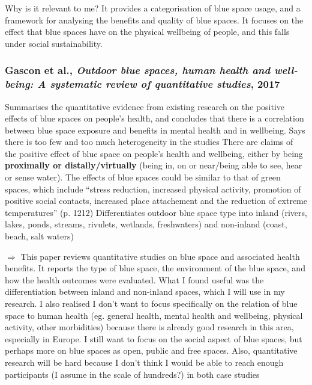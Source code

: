 \documentclass{article}
\begin{document}
\begin{outline}
	Why is it relevant to me? It provides a categorisation of blue space usage, and a framework for analysing the benefits and quality of blue spaces. It focuses on the effect that blue spaces have on the physical wellbeing of people, and this falls under social sustainability. 
\end{outline}

\subsubsection{Gascon et al., \textit{Outdoor blue spaces, human health and well-being: A systematic review of quantitative studies}, 2017} \parencite{gascon2017outdoor}

\begin{outline}
	\1 Summarises the quantitative evidence from existing research on the positive effects of blue spaces on people's health, and concludes that there is a correlation between blue space exposure and benefits in mental health and in wellbeing. Says there is too few and too much heterogeneity in the studies
	\1 There are claims of the positive effect of blue space on people's health and wellbeing, either by being \textbf{proximally or distally/virtually} (being in, on or near/being able to see, hear or sense water). The effects of blue spaces could be similar to that of green spaces, which include ``stress reduction, increased physical activity, promotion of positive social contacts, increased place attachement and the reduction of extreme temperatures'' (p. 1212)
	\1 Differentiates outdoor blue space type into inland (rivers, lakes, ponds, streams, rivulets, wetlands, freshwaters) and non-inland (coast, beach, salt waters)
	
	\1 $\Rightarrow$ This paper reviews quantitative studies on blue space and associated health benefits. It reports the type of blue space, the environment of the blue space, and how the health outcomes were evaluated.
	What I found useful was the differentiation between inland and non-inland spaces, which I will use in my research. I also realised I don't want to focus specifically on the relation of blue space to human health (eg. general health, mental health and wellbeing, physical activity, other morbidities) because there is already good research in this area, especially in Europe. I still want to focus on the social aspect of blue spaces, but perhaps more on blue spaces as open, public and free spaces. Also, quantitative research will be hard because I don't think I would be able to reach enough participants (I assume in the scale of hundreds?) in both case studies
\end{outline}
\end{document}

